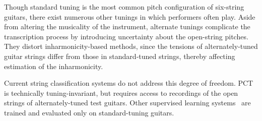 \documentclass[12pt]{cmuthesis}
\begin{document}
Though standard tuning is the most common pitch configuration of six-string guitars, there exist numerous other tunings in which performers often play. Aside from altering the musicality of the instrument, alternate tunings complicate the transcription process by introducing uncertainty about the open-string pitches. They distort inharmonicity-based methods, since the tensions of alternately-tuned guitar strings differ from those in standard-tuned strings, thereby affecting estimation of the inharmonicity. 

Current string classification systems do not address this degree of freedom. PCT~\cite{barbanchoi2012} is technically tuning-invariant, but requires access to recordings of the open strings of alternately-tuned test guitars. Other supervised learning systems~\cite{kehling2014, dittmar2013, abesser2012} are trained and evaluated only on standard-tuning guitars.
\end{document}
